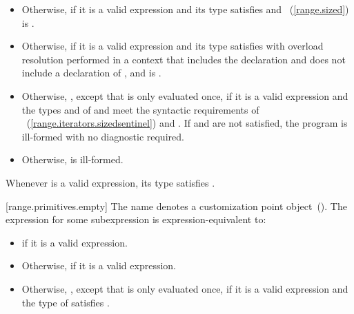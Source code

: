 {\begin{itemize}
\item
  Otherwise,  if it is a valid expression and its type 
  satisfies  and
  ~(\ref{range.sized}) is
  .

\item
  Otherwise,  if it is a valid expression and its type 
  satisfies  with overload resolution
  performed in a context that includes the declaration
   and does not include
  a declaration of , and
   is .

\item
  Otherwise,
  , except that 
  is only evaluated once, if it is a valid expression and the types  and  of
   and  meet the
  syntactic requirements of
  ~(\ref{range.iterators.sizedsentinel}) and
  . If  and
   are not satisfied, the program is ill-formed with no
  diagnostic required.

\item
  Otherwise,  is ill-formed.
\end{itemize}

\pnum
\enternote Whenever  is a valid expression, its
type satisfies . \exitnote

[range.primitives.empty]{}
\pnum
The name  denotes a customization point
object~(). The expression
 for some subexpression  is
expression-equivalent to:

\begin{itemize}
\item
   if it is a valid expression.

\item
  Otherwise,  if it is a valid expression.

\item
  Otherwise, ,
  except that  is only evaluated once, if it is a valid expression and the type of
   satisfies .


\end{itemize}}
